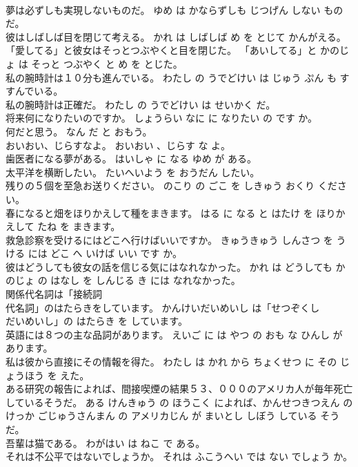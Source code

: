 \documentclass[8pt]{extreport}
\begin{document}
\begin{CJK}{UTF8}{min}
\\	夢は必ずしも実現しないものだ。	ゆめ は かならずしも じつげん しない もの だ。	
\\	彼はしばしば目を閉じて考える。	かれ は しばしば め を とじて かんがえる。	
\\	「愛してる」と彼女はそっとつぶやくと目を閉じた。	「あいしてる」と かのじょ は そっと つぶやく と め を とじた。	
\\	私の腕時計は１０分も進んでいる。	わたし の うでどけい は じゅう ぷん も すすんでいる。	
\\	私の腕時計は正確だ。	わたし の うでどけい は せいかく だ。	
\\	将来何になりたいのですか。	しょうらい なに に なりたい の です か。	
\\	何だと思う。	なん だ と おもう。	
\\	おいおい、じらすなよ。	おいおい 、じらす な よ。	
\\	歯医者になる夢がある。	はいしゃ に なる ゆめ が ある。	
\\	太平洋を横断したい。	たいへいよう を おうだん したい。	
\\	残りの５個を至急お送りください。	のこり の ごこ を しきゅう おくり ください。	
\\	春になると畑をほりかえして種をまきます。	はる に なる と はたけ を ほりかえして たね を まきます。	
\\	救急診察を受けるにはどこへ行けばいいですか。	きゅうきゅう しんさつ を うける には どこ へ いけば いい です か。	
\\	彼はどうしても彼女の話を信じる気にはなれなかった。	かれ は どうしても かのじょ の はなし を しんじる き には なれなかった。	
\\	関係代名詞は「接続詞
\\	代名詞」のはたらきをしています。	かんけいだいめいし は「せつぞくし
\\	だいめいし」の はたらき を しています。	
\\	英語には８つの主な品詞があります。	えいご に は やつ の おも な ひんし が あります。	
\\	私は彼から直接にその情報を得た。	わたし は かれ から ちょくせつ に その じょうほう を えた。	
\\	ある研究の報告によれば、間接喫煙の結果５３、０００のアメリカ人が毎年死亡しているそうだ。	ある けんきゅう の ほうこく によれば、かんせつきつえん の けっか ごじゅうさんまん の アメリカじん が まいとし しぼう している そう だ。	
\\	吾輩は猫である。	わがはい は ねこ で ある。	
\\	それは不公平ではないでしょうか。	それは ふこうへい では ない でしょう か。	

\end{CJK}
\end{document}
